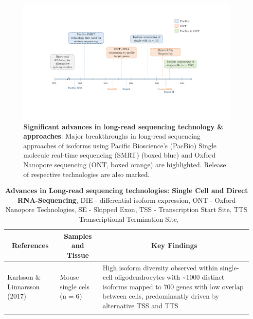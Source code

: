 \begin{changemargin}{1.5cm}
	\begin{landscape}
		\begin{figure}[]
			\includegraphics[page=1,trim={0 4cm 1.8cm 2cm},clip, scale = 0.8]{Figures/Introduction_Figures_Landscape.pdf}
			\caption[Timeline of Long-read Sequencing Technologies \& Approaches]%
			{\textbf{Significant advances in long-read sequencing technology \& approaches}: Major breakthroughs in long-read sequencing approaches of isoforms using Pacific Bioscience's (PacBio) Single molecule real-time sequencing (SMRT) (boxed blue) and Oxford Nanopore sequencing (ONT, boxed orange) are highlighted. Release of respective technologies are also marked.}
			\label{fig:longread_timeline}
		\end{figure}
	\end{landscape}
	
	
	\begin{landscape}
		\small %
		\setlength\tabcolsep{2pt} %
		\renewcommand{\arraystretch}{1}
		\begin{longtable}[c]{p{4cm}p{4cm}p{18cm}}
			\caption[Advances in Long-read sequencing technologies: Single Cell and Direct RNA-Sequencing]%
			{\textbf{Advances in Long-read sequencing technologies: Single Cell and Direct RNA-Sequencing}, DIE - differential isoform expression, ONT - Oxford Nanopore Technologies, SE - Skipped Exon, TSS - Transcription Start Site, TTS - Transcriptional Termination Site, }
			\label{tab: longread_advancedstudies}\\
			
			\toprule
			\multicolumn{1}{c}{References} &
			\multicolumn{1}{c}{Samples and Tissue} &
			\multicolumn{1}{c}{Key Findings} \\* \midrule
			\endfirsthead
			\endhead
			\bottomrule
			\endfoot
			\endlastfoot
			\centering Karlsson \& Linnarsson (2017)\cite{Karlsson2017} &
			\centering Mouse single cels (n = 6)  &
			\tabitem High isoform diversity observed within single-cell oligodendrocytes with \textasciitilde1000 distinct isoforms mapped to 700 genes with low overlap between cells, predominantly driven by alternative TSS and TTS \\
			\hdashline[0.5pt/5pt]	
			

\end{longtable}
\end{landscape}
\end{changemargin}
